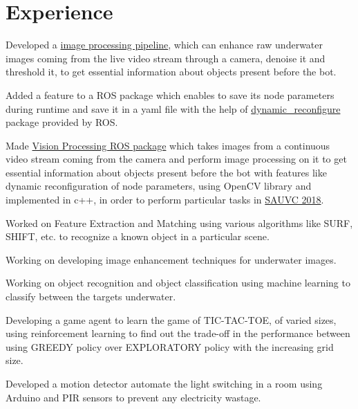 

\lastupdated
{}

\section{Experience}
\begin{tightemize}
\item Developed a \href{https://github.com/ksakash/auv2017-1/blob/IP/task_handler_layer/ip.md}{image processing pipeline}, which can enhance raw underwater images coming from the live video stream through a camera, denoise it and threshold it, to get essential information about objects present before the bot. 
\item Added a feature to a ROS package which enables to save its node parameters during runtime and save it in a yaml file with the help of \href{http://wiki.ros.org/dynamic_reconfigure}{dynamic\_reconfigure} package provided by ROS.
\item Made \href{https://github.com/ksakash/IP_SAUVC/}{Vision Processing ROS package} which takes images from a continuous video stream coming from the camera and perform image processing on it to get essential information about objects present before the bot with features like dynamic reconfiguration of node parameters, using OpenCV library and implemented in c++, in order to perform particular tasks in \href{https://sauvc.org/}{SAUVC 2018}.
\item Worked on Feature Extraction and Matching using various algorithms like SURF, SHIFT, etc. to recognize a known object in a particular scene.
\item Working on developing image enhancement techniques for underwater images.
\item Working on object recognition and object classification using machine learning to classify between the targets underwater.
\end{tightemize}

\begin{tightemize}
\item Developing a game agent to learn the game of TIC-TAC-TOE, of varied sizes, using reinforcement learning to find out the trade-off in the performance between using GREEDY policy over EXPLORATORY policy with the increasing grid size.
\end{tightemize}
\begin{tightemize}
\item Developed a motion detector automate the light switching in a room using Arduino and PIR sensors to prevent any
electricity wastage.
\end{tightemize}

